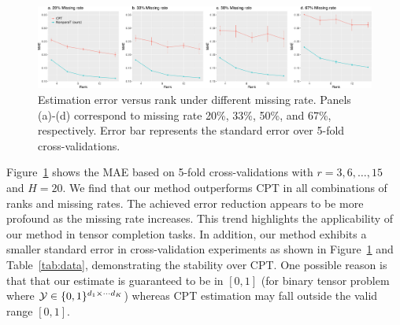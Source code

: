 \documentclass[11pt]{article}
\theoremstyle{plain}
\theoremstyle{definition}
\begin{document}
\begin{figure}[h!]
\includegraphics[width = \textwidth]{figure/brain_sim.pdf}
\caption{Estimation error versus rank under different missing rate. Panels (a)-(d) correspond to missing rate 20\%, 33\%, 50\%, and 67\%, respectively. Error bar represents the standard error over 5-fold cross-validations.}\label{fig:braincv}
\end{figure}

Figure~\ref{fig:braincv} shows the MAE based on 5-fold cross-validations with $r = 3,6,\ldots, 15$ and $H = 20$. We find that our method outperforms CPT in all combinations of ranks and missing rates. The achieved error reduction appears to be more profound as the missing rate increases. This trend highlights the applicability of our method in tensor completion tasks. In addition, our method exhibits a smaller standard error in cross-validation experiments as shown in Figure~\ref{fig:braincv} and Table~\ref{tab:data}, demonstrating the stability over CPT.  One possible reason is that that our estimate is guaranteed to be in $[0,1]$ (for binary tensor problem where $\mathcal{Y}\in\{0,1\}^{d_1\times\cdots d_K}$) whereas CPT estimation may fall outside the valid range $[0,1]$. 
\end{document}
